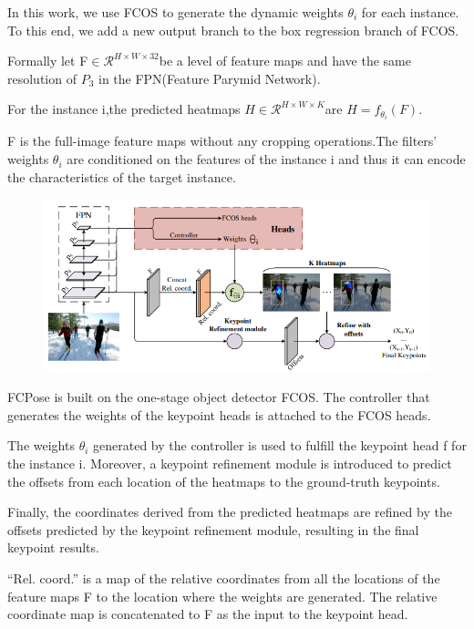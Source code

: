 \documentclass[11pt]{article}
\begin{document}
In this work, we use FCOS to generate the dynamic weights $\theta_i$ for each instance. To this end, we add a new output branch to the box regression branch of FCOS.

Formally let F$\in \mathcal{R}^{H\times W\times 32}$be a level of feature maps and have the same resolution of $P_3$ in the FPN(Feature Parymid Network).

For the instance i,the predicted heatmaps $H\in \mathcal{R}^{H\times W\times K}$are $H = f_{\theta_i}(F)$.

F is the full-image feature maps without any cropping operations.The filters' weights $\theta_i$ are conditioned on the features of the instance i and thus it can encode the characteristics of the target instance.
\begin{figure}[h]
	\centering
	\includegraphics[scale = 0.5]{9}
\end{figure}

FCPose is built on the one-stage object detector FCOS. The controller that generates the weights of the keypoint heads is attached to the FCOS heads. 

The weights $\theta_i$ generated by the controller is used to fulfill the keypoint head f for the instance i. Moreover, a keypoint refinement module is introduced to predict the offsets from each location of the heatmaps to the ground-truth keypoints. 

Finally, the coordinates derived from the predicted heatmaps are refined by the offsets
predicted by the keypoint refinement module, resulting in the final keypoint results.

“Rel. coord.” is a map of the relative coordinates from all the locations of the feature maps F to the location where the weights are generated. The relative coordinate map is concatenated to F as the input to the keypoint head.
\end{document}
